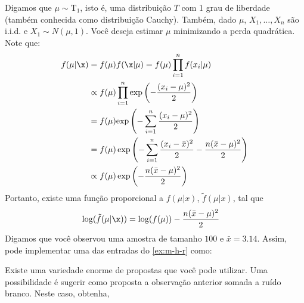 \begin{example}
 Digamos que $\mu \sim \text{T}_{1}$,
 isto é, uma distribuição $T$ com 1 grau de liberdade
 (também conhecida como distribuição Cauchy).
 Também, dado $\mu$, $X_1,\ldots,X_n$ são i.i.d.
 e $X_1 \sim N(\mu,1)$.
 Você deseja estimar $\mu$ minimizando a 
 perda quadrática. Note que:
 \begin{align*}
  f(\mu|\x)
  &= f(\mu)f(\x|\mu)
  = f(\mu)\prod_{i=1}^{n}{f(x_i|\mu)} \\
  &\propto f(\mu)\prod_{i=1}^{n}{\exp\left(-\frac{(x_i-\mu)^2}{2}\right)} \\
  &= f(\mu){\exp\left(-\sum_{i=1}^{n}{\frac{(x_i-\mu)^2}{2}}\right)} \\
  &= f(\mu)\exp\left(-\sum_{i=1}^{n}{\frac{(x_i-\bar{x})^2}{2}}-\frac{n(\bar{x}-\mu)^2}{2}\right) \\
  &\propto f(\mu)\exp\left(-\frac{n(\bar{x}-\mu)^2}{2}\right)
 \end{align*}
 Portanto, existe uma função proporcional a
 $f(\mu|x)$, $\tilde{f}(\mu|x)$, tal que
 \begin{align*}
  \log(\tilde{f}(\mu|\x))
  &= \log(f(\mu))-\frac{n(\bar{x}-\mu)^2}{2}
 \end{align*}
 Digamos que você observou uma amostra de
 tamanho $100$ e $\bar{x}=3.14$.
 Assim, pode implementar uma das
 entradas do \cref{ex:m-h-r} como:
\begin{knitrout}
\color{fgcolor}\begin{kframe}
\begin{alltt}
 \hlkwb{<-} \hlstd{(}\hlstd{)} \hlstd{(}\hlstd{=}\hlstd{))}\hlopt{-}\hlstd{(}\hlopt{*}\hlstd{(}\hlopt{-}\hlopt{^}\hlstd{)}\hlopt{/}
\end{alltt}
\end{kframe}
\end{knitrout}
Existe uma variedade enorme de propostas que
você pode utilizar. Uma possibilidade é
sugerir como proposta a observação anterior
somada a ruído branco. Neste caso, obtenha,
\begin{knitrout}
\color{fgcolor}\begin{kframe}
\begin{alltt}
 \hlkwb{<-} \hlstd{(}\hlopt{+}\hlstd{(}\hlstd{)}
 \hlkwb{<-} \hlstd{(}\hlstd{,}\hlstd{)} \hlstd{(}

\end{alltt}
\end{kframe}
\end{knitrout}
\end{example}
